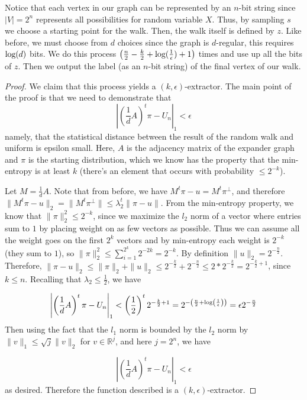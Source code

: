 \documentclass[11pt]{article}
\theoremstyle{definition}
\theoremstyle{definition}
\theoremstyle{definition}
\newcommand{\txt}[1]
{\textnormal{#1}}
\begin{document}
Notice that each vertex in our graph can be represented by an $n$-bit string since $|V| = 2^n$ represents all possibilities for random variable $X$. Thus, by sampling $s$ we choose a starting point for the walk. Then, the walk itself is defined by $z$. Like before, we must choose from $d$ choices since the graph is $d$-regular, this requires $\txt{log}(d)$ bits. We do this process $\left(\frac{n}{2} - \frac{k}{2} + \txt{log}(\frac{1}{\epsilon}) + 1\right)$ times and use up all the bits of $z$. Then we output the label (as an $n$-bit string) of the final vertex of our walk. 

\begin{proof}
We claim that this process yields a $(k, \epsilon)$-extractor. The main point of the proof is that we need to demonstrate that 
\[
\left| \left(\frac{1}{d}A\right)^t\pi - U_n \right|_1 < \epsilon
\]
namely, that the statistical distance between the result of the random walk and uniform is epsilon small. Here, $A$ is the adjacency matrix of the expander graph and $\pi$ is the starting distribution, which we know has the property that the min-entropy is at least $k$ (there's an element that occurs with probability $\leq 2^{-k}$). 

Let $M = \frac{1}{d} A$. 
Note that from before, we have $M^t\pi - u = M^t\pi^{\perp}$, and therefore $\|M^t\pi - u\|_2 = \|M^t\pi^{\perp}\| \leq \lambda_2^t \|\pi - u\|$. From the min-entropy property, we know that $\|\pi\|_2^2 \leq 2^{-k}$, since we maximize the $l_2$ norm of a vector where entries sum to $1$ by placing weight on as few vectors as possible. Thus we can assume all the weight goes on the first $2^k$ vectors and by min-entropy each weight is $2^{-k}$ (they sum to $1$), so $\|\pi\|_2^2 \leq \sum_{i = 1}^{2^k} 2^{-2k} = 2^{-k}$. By definition $\|u\|_2 = 2^{-\frac{n}{2}}$. Therefore, $\|\pi - u\|_2 \leq \|\pi\|_2 + \|u\|_2 \leq 2^{-\frac{k}{2}} + 2^{-\frac{n}{2}} \leq 2*2^{-\frac{k}{2}} = 2^{-\frac{k}{2} + 1}$, since $k \leq n$. Recalling that $\lambda_2 \leq \frac{1}{2}$, we have

\[
\left| \left(\frac{1}{d}A\right)^t\pi - U_n \right|_1 < \left(\frac{1}{2}\right)^t2^{-\frac{k}{2} + 1} = 2^{-\left(\frac{n}{2} + \txt{log}\left(\frac{1}{\epsilon}\right)\right)} = \epsilon 2^{-\frac{n}{2}}
\]
Then using the fact that the $l_1$ norm is bounded by the $l_2$ norm by $\|v\|_1 \leq \sqrt{j}\|v\|_2$ for $v \in \mathbb{R}^j$, and here $j = 2^n$, we have 

\[
\left| \left(\frac{1}{d}A\right)^t\pi - U_n \right|_1 < \epsilon
\]
as desired. Therefore the function described is a $(k, \epsilon)$-extractor.
\end{proof}
\end{document}
